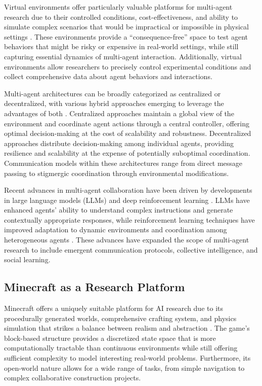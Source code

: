 \documentclass[a4paper, 12pt]{article}
\begin{document}
Virtual environments offer particularly valuable platforms for multi-agent research due to their controlled conditions, cost-effectiveness, and ability to simulate complex scenarios that would be impractical or impossible in physical settings \autocite{shu2024effectivegenaimultiagentcollaboration, Lhaksmana2018RoleBasedMF}. These environments provide a ``consequence-free'' space to test agent behaviors that might be risky or expensive in real-world settings, while still capturing essential dynamics of multi-agent interaction. Additionally, virtual environments allow researchers to precisely control experimental conditions and collect comprehensive data about agent behaviors and interactions.

Multi-agent architectures can be broadly categorized as centralized or decentralized, with various hybrid approaches emerging to leverage the advantages of both \autocite{Leeuwen2021SelfOrganizingMS}. Centralized approaches maintain a global view of the environment and coordinate agent actions through a central controller, offering optimal decision-making at the cost of scalability and robustness. Decentralized approaches distribute decision-making among individual agents, providing resilience and scalability at the expense of potentially suboptimal coordination. Communication models within these architectures range from direct message passing to stigmergic coordination through environmental modifications.

Recent advances in multi-agent collaboration have been driven by developments in large language models (LLMs) and deep reinforcement learning \autocite{shu2024effectivegenaimultiagentcollaboration, qiu2024collaborativeintelligencepropagatingintentions}. LLMs have enhanced agents' ability to understand complex instructions and generate contextually appropriate responses, while reinforcement learning techniques have improved adaptation to dynamic environments and coordination among heterogeneous agents \autocite{chen2024sagentsselforganizingagentsopenended}. These advances have expanded the scope of multi-agent research to include emergent communication protocols, collective intelligence, and social learning.

\subsection{Minecraft as a Research Platform}

Minecraft offers a uniquely suitable platform for AI research due to its procedurally generated worlds, comprehensive crafting system, and physics simulation that strikes a balance between realism and abstraction \autocite{fan2022minedojobuildingopenendedembodied}. The game's block-based structure provides a discretized state space that is more computationally tractable than continuous environments while still offering sufficient complexity to model interesting real-world problems. Furthermore, its open-world nature allows for a wide range of tasks, from simple navigation to complex collaborative construction projects.
\end{document}
